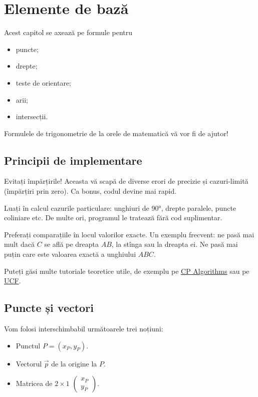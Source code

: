 \documentclass[../main.tex]{subfiles}
\begin{document}
\chapter{Elemente de bază}

Acest capitol se axează pe formule pentru

\begin{itemize}
  \item puncte;
  \item drepte;
  \item teste de orientare;
  \item arii;
  \item intersecții.
\end{itemize}

Formulele de trigonometrie de la orele de matematică vă vor fi de ajutor!

\section{Principii de implementare}

Evitați împărțirile! Aceasta vă scapă de diverse erori de precizie și cazuri-limită (împărțiri prin zero). Ca bonus, codul devine mai rapid.

Luați în calcul cazurile particulare: unghiuri de 90°, drepte paralele, puncte coliniare etc. De multe ori, programul le tratează fără cod suplimentar.

Preferați comparațiile în locul valorilor exacte. Un exemplu frecvent: ne pasă mai mult dacă $C$ se află pe dreapta $AB$, la stînga sau la dreapta ei. Ne pasă mai puțin care este valoarea exactă a unghiului $ABC$.

Puteți găsi multe tutoriale teoretice utile, de exemplu pe \href{https://cp-algorithms.com/geometry/basic-geometry.html}{CP Algorithms} sau pe \href{https://www.cs.ucf.edu/~dmarino/progcontests/cop4516/notes/Geometry-Nadeem.pdf}{UCF}.

\section{Puncte și vectori}

Vom folosi interschimbabil următoarele trei noțiuni:

\begin{itemize}
  \item Punctul $P = (x_P, y_P)$.
  \item Vectorul $\vec{p}$ de la origine la $P$.
  \item Matricea de $2 \times 1$ $\begin{pmatrix} x_P\\ y_P \end{pmatrix}$.
\end{itemize}
\end{document}
